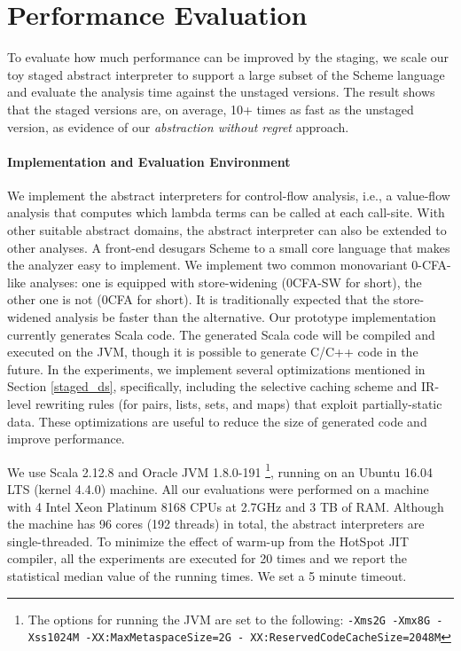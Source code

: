 \section{Performance Evaluation} \label{evaluation}

To evaluate how much performance can be improved by the staging, we scale our
toy staged abstract interpreter to support a large subset of the Scheme language and evaluate
the analysis time against the unstaged versions. The result shows that the
staged versions are, on average, 10+ times as fast as the unstaged version, as
evidence of our \textit{abstraction without regret} approach.

\vspace{-5pt}
\paragraph{Implementation and Evaluation Environment} We implement the abstract
interpreters for control-flow analysis, i.e., a value-flow analysis that
computes which lambda terms can be called at each call-site.
With other suitable abstract domains, the abstract interpreter
can also be extended to other analyses.
A front-end desugars Scheme to a small core language that makes the analyzer
easy to implement. We implement two common monovariant 0-CFA-like analyses: one
is equipped with store-widening (0CFA-SW for short), the other one is not (0CFA
for short). It is traditionally expected that the store-widened analysis be faster than the
alternative.  Our prototype implementation currently generates Scala code. The
generated Scala code will be compiled and executed on the JVM, though it is possible to
generate C/C++ code in the future. In the experiments, we implement several
optimizations mentioned in Section \ref{staged_ds}, specifically, including the
selective caching scheme and IR-level rewriting rules (for pairs, lists, sets,
and maps) that exploit partially-static data. These optimizations are useful to
reduce the size of generated code and improve performance.

We use Scala 2.12.8 and Oracle JVM 1.8.0-191 \footnote{The options for
running the JVM are set to the following: \texttt{-Xms2G -Xmx8G -Xss1024M
-XX:MaxMetaspaceSize=2G - XX:ReservedCodeCacheSize=2048M}},
running on an Ubuntu 16.04 LTS (kernel 4.4.0) machine. All our
evaluations were performed on a machine with 4 Intel Xeon Platinum
8168 CPUs at 2.7GHz and 3 TB of RAM. Although the machine has 96 cores
(192 threads) in total, the abstract interpreters are single-threaded.
To minimize the effect of warm-up from the HotSpot JIT compiler,
all the experiments are executed for 20 times and we report the
statistical median value of the running times. We set a 5 minute
timeout.

